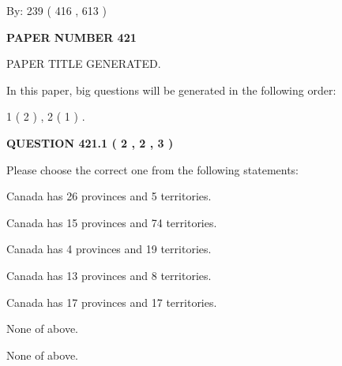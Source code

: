 \documentclass[12pt]{article}
\begin{document}
   
\hspace{1.0in} By: 
 239 ( 416 ,  613 )
   
   
   
   
\newpage 
\setcounter{page}{ 
   421001 } 
   
   
   
   
 {\textbf{ \Large{ PAPER NUMBER  421  }}}
   
   
\vspace{0.2in}
   
   
   
   
   
   
   
   
 \vspace{0.2in}
 
 
 
 
   
   
 PAPER TITLE GENERATED.
   
   
   
\vspace{0.2in}
   
In this paper, big questions will be generated in the following order: 
   
   
   1 ( 2 )
 ,
   2 ( 1 )
 .
  
\vspace{0.2in}
  
{\textbf{\Large{QUESTION
421.1 
 ( 2 , 2 , 3 )
}}}
  
  
Please choose the correct one from the following statements:
 
 
Canada has  26 provinces and  5 territories.
 
 
Canada has  15 provinces and  74 territories.
 
 
Canada has   4 provinces and  19 territories.
 
 
Canada has  13 provinces and  8 territories.
 
 
Canada has  17 provinces and  17 territories.
 
 
 None of above.
 
 
\noindent{}
 
 
 None of above.
 
\end{document}
